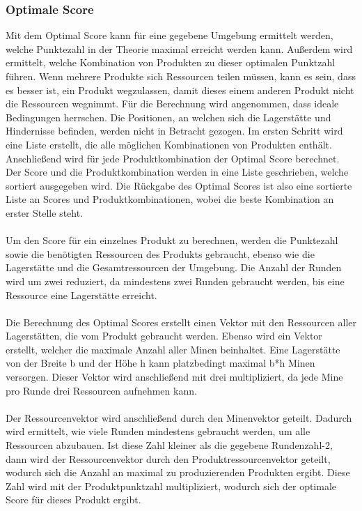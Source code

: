 \subsubsection{Optimale Score}
Mit dem Optimal Score kann für eine gegebene Umgebung ermittelt werden, welche Punktezahl in der Theorie maximal erreicht werden kann. Außerdem wird ermittelt, welche Kombination von Produkten zu dieser optimalen Punktzahl führen. Wenn mehrere Produkte sich Ressourcen teilen müssen, kann es sein, dass es besser ist, ein Produkt wegzulassen, damit dieses einem anderen Produkt nicht die Ressourcen wegnimmt. 
Für die Berechnung wird angenommen, dass ideale Bedingungen herrschen. Die Positionen, an welchen sich die Lagerstätte und Hindernisse befinden, werden nicht in Betracht gezogen. 
Im ersten Schritt wird eine Liste erstellt, die alle möglichen Kombinationen von Produkten enthält. Anschließend wird für jede Produktkombination der Optimal Score berechnet. Der Score und die Produktkombination werden in eine Liste geschrieben, welche sortiert ausgegeben wird.  Die Rückgabe des Optimal Scores ist also eine sortierte Liste an Scores und Produktkombinationen, wobei die beste Kombination an erster Stelle steht.
\\\\
Um den Score für ein einzelnes Produkt zu berechnen, werden die Punktezahl sowie die benötigten Ressourcen des Produkts gebraucht, ebenso wie die Lagerstätte und die Gesamtressourcen der Umgebung. Die Anzahl der Runden wird um zwei reduziert, da mindestens zwei Runden gebraucht werden, bis eine Ressource eine Lagerstätte erreicht.
\\\\
Die Berechnung des Optimal Scores erstellt einen Vektor mit den Ressourcen aller Lagerstätten, die vom Produkt gebraucht werden. Ebenso wird ein Vektor erstellt, welcher die maximale Anzahl aller Minen beinhaltet. Eine Lagerstätte von der Breite b und der Höhe h kann platzbedingt maximal b*h Minen versorgen. Dieser Vektor wird anschließend mit drei multipliziert, da jede Mine pro Runde drei Ressourcen aufnehmen kann.
\\\\
Der Ressourcenvektor wird anschließend durch den Minenvektor geteilt. Dadurch wird ermittelt, wie viele Runden mindestens gebraucht werden, um alle Ressourcen abzubauen. Ist diese Zahl kleiner als die gegebene Rundenzahl-2, dann wird der Ressourcenvektor durch den Produktressourcenvektor geteilt, wodurch sich die Anzahl an maximal zu produzierenden Produkten ergibt. Diese Zahl wird mit der Produktpunktzahl multipliziert, wodurch sich der optimale Score für dieses Produkt ergibt.
